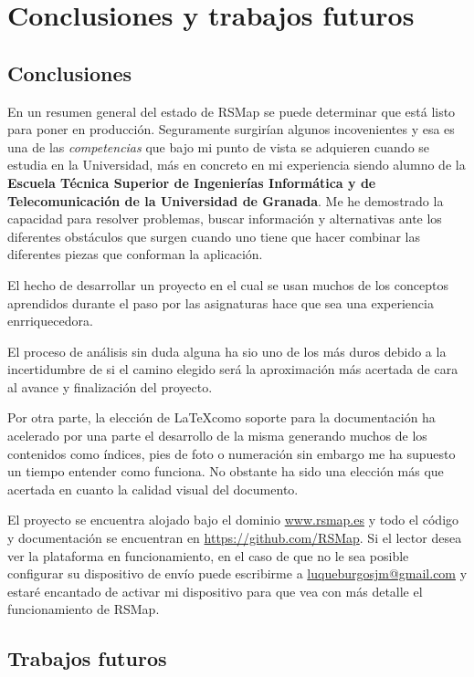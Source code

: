 \chapter{Conclusiones y trabajos futuros}
\label{chap8}

\section{Conclusiones}
En un resumen general del estado de RSMap se puede determinar que está listo para poner en producción. Seguramente surgirían algunos incovenientes y esa es una de las \textit{competencias} que bajo mi punto de vista se adquieren cuando se estudia en la Universidad, más en concreto en mi experiencia siendo alumno de la \textbf{Escuela Técnica Superior de Ingenierías Informática y de Telecomunicación de la Universidad de Granada}. Me he demostrado la capacidad para resolver problemas, buscar información y alternativas ante los diferentes obstáculos que surgen cuando uno tiene que hacer combinar las diferentes piezas que conforman la aplicación.

El hecho de desarrollar un proyecto en el cual se usan muchos de los conceptos aprendidos durante el paso por las asignaturas hace que sea una experiencia enrriquecedora.

\bigskip

El proceso de análisis sin duda alguna ha sio uno de los más duros debido a la incertidumbre de si el camino elegido será la aproximación más acertada de cara al avance y finalización del proyecto.

Por otra parte, la elección de \LaTeX como soporte para la documentación ha acelerado por una parte el desarrollo de la misma generando muchos de los contenidos como índices, pies de foto o numeración sin embargo me ha supuesto un tiempo entender como funciona. No obstante ha sido una elección más que acertada en cuanto la calidad visual del documento.

\newpage

El proyecto se encuentra alojado bajo el dominio \url{www.rsmap.es} y todo el código y documentación se encuentran en \url{https://github.com/RSMap}. Si el lector desea ver la plataforma en funcionamiento, en el caso de que no le sea posible configurar su dispositivo de envío puede escribirme a \url{luqueburgosjm@gmail.com} y estaré encantado de activar mi dispositivo para que vea con más detalle el funcionamiento de RSMap.

\section{Trabajos futuros}

